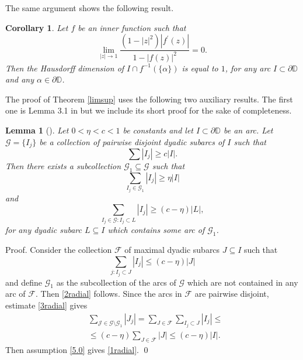 \documentclass[a4paper,12pt]{article}
\newtheorem{cor}{Corollary}[section]
\newtheorem{lem}{Lemma}[section]
\theoremstyle{definition}
\numberwithin{equation}{section}
\newcommand{\D}{\mathbb D}
\begin{document}
The same argument shows the following result. 

\begin{cor}
    \label{local}
    Let $f$ be an inner function such that
$$
\lim _{|z| \rightarrow 1} \frac{\left(1-|z|^{2}\right)\left|f^{\prime}(z)\right|}{1-|f(z)|^{2}}=0. 
$$
Then the Hausdorff dimension of $I \cap f^{-1}(\{\alpha\})$ is equal to $1$, for any arc $I \subset \partial \D$ and any $\alpha \in \partial \mathbb{D}$.
\end{cor} 

The proof of Theorem \ref{limsup} uses the following two auxiliary results. The first one is Lemma 3.1 in \cite{FN} but we include its short proof for the sake of completeness. 

\begin{lem}[\cite{FN}]
    \label{Lemma1.5}
    Let $0< \eta <c<1$ be constants and let $I \subset \partial \mathbb{D}$ be an arc. Let $\mathcal{G} = \{I_j \}$ be a collection of pairwise disjoint dyadic subarcs of $I$ such that
\begin{equation}
    \label{5.0}
    \sum |I_j| \geqslant c  |I| . 
\end{equation}
Then there exists a subcollection $\mathcal{G}_1 \subseteq \mathcal{G}$ such that 
\begin{equation}
\label{1radial}
\sum_{I_j \in \mathcal{G}_{1}}\left|I_{j}\right| \geqslant \eta|I| 
\end{equation}
and
\begin{equation}
    \label{2radial}
\sum_{I_j \in \mathcal{G}: I_{j} \subset L} |I_{j}|\geqslant(c-\eta) |L| , 
\end{equation}
for any dyadic subarc $L \subseteq I$ which contains some arc of $\mathcal{G}_1$.

\end{lem}

 

Proof. Consider the collection $\mathcal{F}$ of maximal dyadic subarcs $J \subseteq I$ such that
\begin{equation}
    \label{3radial}
\sum_{j : I_{j} \subset J }\left|I_{j}\right| \leq(c-\eta)|J|    
\end{equation}
and define $\mathcal{G}_{1}$ as the subcollection  of the arcs of $\mathcal{G}$ which are not contained in any arc of $\mathcal{F}$. Then \eqref{2radial} follows. Since the arcs in $\mathcal{F}$ are pairwise  disjoint, estimate \eqref{3radial} gives
$$
\begin{aligned}
& \sum_{\mathcal{J} \in \mathcal{G} \setminus \mathcal{G}_{1}}\left|J_{j}\right|=\sum_{J \in \mathcal{F}} \sum_{I_j \subset  J}\left|I_{j}\right| \leq \\
& \leq(c-\eta) \sum_{J \in \mathcal{F}}|J| \leq(c-\eta)|I| . 
\end{aligned}
$$
Then assumption \eqref{5.0} gives \eqref{1radial}.
\qed
\end{document}
